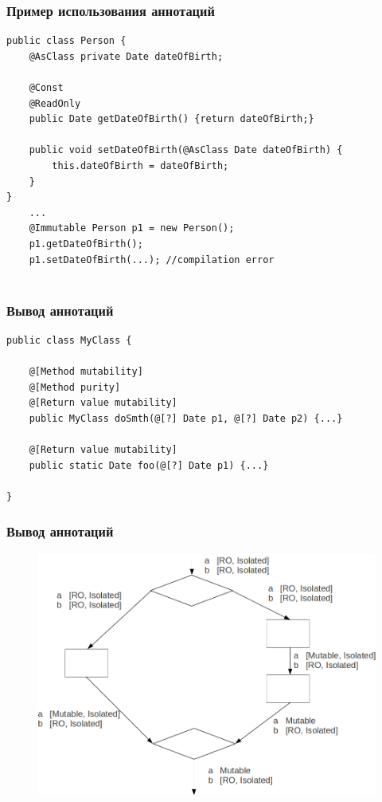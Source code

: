\documentclass[10pt,pdf,hyperref={unicode}]{beamer}
\begin{document}
\lstset{language=java}
\begin{frame}[fragile]
	\transwipe
	\frametitle{Пример использования аннотаций}
\begin{lstlisting}
public class Person {
    @AsClass private Date dateOfBirth;
		
    @Const
    @ReadOnly 
    public Date getDateOfBirth() {return dateOfBirth;}

    public void setDateOfBirth(@AsClass Date dateOfBirth) {
        this.dateOfBirth = dateOfBirth;
    }
}
	...
    @Immutable Person p1 = new Person();		
    p1.getDateOfBirth();
    p1.setDateOfBirth(...); //compilation error
	
	\end{lstlisting}
\end{frame}

\lstset{language=java}
\begin{frame}[fragile]
	\transwipe
	\frametitle{Вывод аннотаций}
	
	\begin{lstlisting}
public class MyClass {
	
    @[Method mutability]
    @[Method purity]
    @[Return value mutability]
    public MyClass doSmth(@[?] Date p1, @[?] Date p2) {...}

    @[Return value mutability]
    public static Date foo(@[?] Date p1) {...}
							  
}	
	\end{lstlisting}
\end{frame}



\begin{frame}
	\transwipe
	\frametitle{Вывод аннотаций}
	\begin{figure}[p]
		\centering
		\includegraphics[scale=0.25]{pics/1.png}
\end{figure}
\end{frame}
\end{document}

